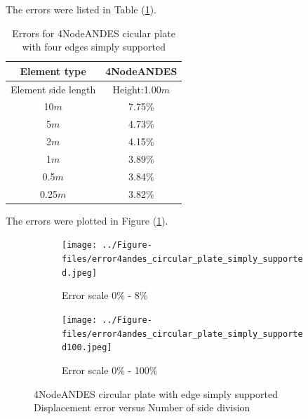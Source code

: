 \documentclass[fleqn,11pt]{article}
\begin{document}
The errors were listed in Table (\ref{table Errors for 4NodeANDES cicular plate with four edges simply supported}).

\begin{table}[H]
  \centering
  \caption{Errors for 4NodeANDES cicular plate with four edges simply supported}
  \label{table Errors for 4NodeANDES cicular plate with four edges simply supported}
\begin{tabular}{|c|c|}
\hline
Element type     & 4NodeANDES          \\ \hline
Element side length & Height:1.00$m$   \\ \hline
10$m$            & 7.75\%        \\ \hline
5$m$             & 4.73\%        \\ \hline
2$m$             & 4.15\%        \\ \hline
1$m$             & 3.89\%        \\ \hline
0.5$m$           & 3.84\%        \\ \hline
0.25$m$          & 3.82\%       \\
\hline
\end{tabular}
\end{table}

The errors were plotted in Figure (\ref{fig 4NodeANDES circular plate with four edge simply supported}).
\begin{figure}[H]
  \begin{subfigure}{0.5\textwidth}
    \centering
    \texttt{[image: ../Figure-files/error4andes\_circular\_plate\_simply\_supported.jpeg]}
    \caption{Error scale 0\% - 8\%}
  \end{subfigure}
  \begin{subfigure}{0.5\textwidth}
    \centering
    \texttt{[image: ../Figure-files/error4andes\_circular\_plate\_simply\_supported100.jpeg]}
    \caption{Error scale 0\% - 100\%}
  \end{subfigure}
  \captionsetup{justification=centering,margin=3cm}
  \caption{4NodeANDES circular plate with edge simply supported\\
      Displacement error   versus   Number of side division}
  \label{fig 4NodeANDES circular plate with four edge simply supported}
\end{figure}
\end{document}
